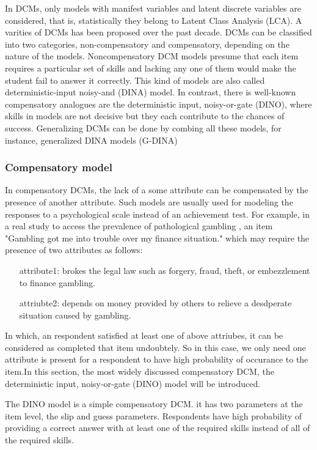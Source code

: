 \documentclass[11pt]{article}
\begin{document}
In DCMs, only models with manifest variables and latent discrete variables are considered, that is, statistically they belong to Latent Class Analysis (LCA). A varities of DCMs has been proposed over the past decade. DCMs can be classified into two categories, non-compensatory and compensatory, depending on the nature of the models. Noncompensatory DCM models presume that each item requires a particular set of skills and lacking any one of them would make the student fail to answer it correctly. This kind of models are also called deterministic-input noisy-and (DINA) model\cite{de2009dina}. In contrast, there is well-known compensatory analogues are the deterministic input, noisy-or-gate (DINO)\cite{templin2006measurement}, where skills in models are not decisive but they each contribute to the chances of success. Generalizing DCMs can be done by combing all these models, for instance,  generalized DINA models (G-DINA) \cite{de2011generalized}
\subsubsection{Compensatory model}

 In compensatory DCMs, the lack of a some attribute can be
compensated by the presence of another attribute. Such models are usually
used for modeling the responses to a psychological scale instead of an achievement test.
For example, in a real study to access the prevalence of pathological gambling \cite{templin2010diagnostic}, an item "Gambling got me into trouble over my finance
situation." which may require the presence of two attributes as follows:
\begin{itemize}
	\item[attribute1:] brokes the legal law such as forgery, fraud, theft, or embezzlement to finance gambling.
	\item[attriubte2:] depends on money provided by others to relieve a desdperate situation caused by gambling.	
\end{itemize}

 
In which, an respondent satisfied at least one of above attriubes, it can be considered as completed that item undoubtely. So in this case, we only need one attribute is present for a respondent to have high probability of occurance to the item.In this section, the most widely discussed compensatory DCM, the deterministic input, noisy-or-gate (DINO) model \cite{templin2006measurement} will be introduced. 

The DINO model is a simple compensatory DCM. it has two parameters at the item level, the slip and guess parameters. Respondents have high probability of providing a correct answer with at least one of the
required skills instead of all of the required skills.
\end{document}

